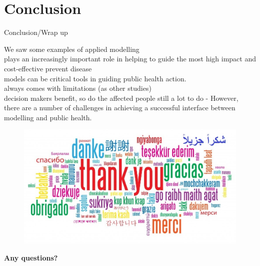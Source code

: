 \documentclass[table]{beamer}\usepackage[]{graphicx}\usepackage[]{color}
\newcommand\unnumbered{\setbeamertemplate{footline}{}}
\begin{document}
\section{Conclusion}
\begin{frame}[fragile]{Conclusion/Wrap up}



We saw some examples of applied modelling\\
plays an increasingly important role in helping to guide the most high impact and cost-effective prevent disease\\
models can be critical tools in guiding public health action.\\


always comes with limitations (as other studies)\\
decision makers benefit, so do the affected people
still a lot to do - However, there are a number of challenges in achieving a successful interface between modelling and public health.


\end{frame}


{\unnumbered
\begin{frame}[noframenumbering]{}
\begin{center}
\begin{figure}
  \centering
  \includegraphics[width=\textwidth,height=0.5\textheight,keepaspectratio]{Thank-you-word-cloud.jpg}
\end{figure}

\Huge{\textbf{Any questions?}}

\end{center}
\end{frame}}
\end{document}
